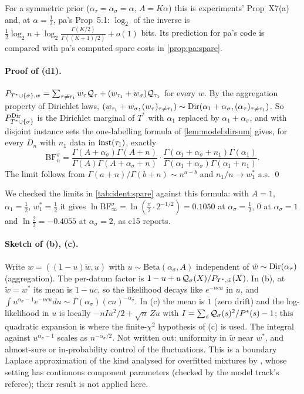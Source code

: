 For a symmetric prior ($\alpha_\tau=\alpha_\sigma=\alpha$, $A=K\alpha$) this is experiments' Prop~X7(a) and, at $\alpha=\frac12$, pa's Prop~5.1: $\log_2$ of the inverse is $\frac12\log_2n+\log_2\frac{\Gamma(K/2)}{\Gamma((K+1)/2)}+o(1)$ bits. Its prediction for pa's code is compared with pa's computed spare costs in \cref{prop:pa:spare}.

\paragraph{Proof of (d1).} $P_{T^*\cup\{\sigma\},w}=\sum_{\tau\ne\tau_1}w_\tau\mathcal{Q}_\tau+(w_{\tau_1}+w_\sigma)\mathcal{Q}_{\tau_1}$ for every $w$. By the aggregation property of Dirichlet laws, $(w_{\tau_1}+w_\sigma,(w_\tau)_{\tau\ne\tau_1})\sim\mathrm{Dir}(\alpha_1+\alpha_\sigma,(\alpha_\tau)_{\tau\ne\tau_1})$. So $P^{\mathrm{Dir}}_{T^*\cup\{\sigma\}}$ is the Dirichlet marginal of $T^*$ with $\alpha_1$ replaced by $\alpha_1+\alpha_\sigma$, and with disjoint instance sets the one-labelling formula of \cref{lem:model:dirsum} gives, for every $D_n$ with $n_1$ data in $\mathrm{inst}(\tau_1)$, exactly
\[\mathrm{BF}^\sigma_n=\frac{\Gamma(A+\alpha_\sigma)\Gamma(A+n)}{\Gamma(A)\Gamma(A+\alpha_\sigma+n)}\cdot\frac{\Gamma(\alpha_1+\alpha_\sigma+n_1)\Gamma(\alpha_1)}{\Gamma(\alpha_1+\alpha_\sigma)\Gamma(\alpha_1+n_1)}.\]
The limit follows from $\Gamma(a+n)/\Gamma(b+n)\sim n^{a-b}$ and $n_1/n\to w^*_1$ a.s. \qed

We checked the limits in \cref{tab:ident:spare} against this formula: with $A=1$, $\alpha_1=\frac12$, $w^*_1=\frac12$ it gives $\ln\mathrm{BF}^\sigma_\infty=\ln(\frac\pi2\cdot2^{-1/2})=0.1050$ at $\alpha_\sigma=\frac12$, $0$ at $\alpha_\sigma=1$ and $\ln\frac23=-0.4055$ at $\alpha_\sigma=2$, as c15 reports.

\paragraph{Sketch of (b), (c).} Write $w=((1-u)\tilde w,u)$ with $u\sim\mathrm{Beta}(\alpha_\sigma,A)$ independent of $\tilde w\sim\mathrm{Dir}(\alpha_\tau)$ (aggregation). The per-datum factor is $1-u+u\,\mathcal{Q}_\sigma(X)/P_{T^*,\tilde w}(X)$. In (b), at $\tilde w=w^*$ its mean is $1-uc$, so the likelihood decays like $e^{-ncu}$ in $u$, and $\int u^{\alpha_\sigma-1}e^{-ncu}du\sim\Gamma(\alpha_\sigma)(cn)^{-\alpha_\sigma}$. In (c) the mean is $1$ (zero drift) and the log-likelihood in $u$ is locally $-nIu^2/2+\sqrt n\,Zu$ with $I=\sum_s\mathcal{Q}_\sigma(s)^2/P^*(s)-1$; this quadratic expansion is where the finite-$\chi^2$ hypothesis of (c) is used. The integral against $u^{\alpha_\sigma-1}$ scales as $n^{-\alpha_\sigma/2}$. Not written out: uniformity in $\tilde w$ near $w^*$, and almost-sure or in-probability control of the fluctuations. This is a boundary Laplace approximation of the kind analysed for overfitted mixtures by \citet{rousseau2011asymptotic}, whose setting has continuous component parameters (checked by the model track's referee); their result is not applied here.

